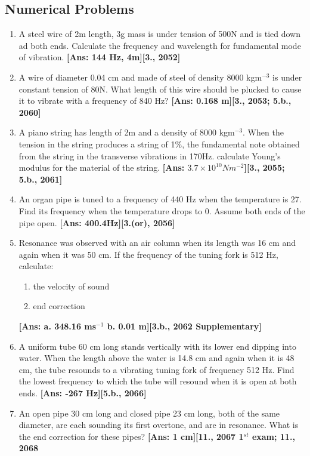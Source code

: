 \documentclass[a4paper,10pt]{report}
\begin{document}
 \subsection{Numerical Problems}
  \begin{enumerate}
   \item A steel wire of 2m length, 3g mass is under tension of 500N and is tied down ad both ends. Calculate the frequency
    and wavelength for fundamental mode of vibration. \textbf{[Ans: 144 Hz, 4m][3., 2052]}
   \item A wire of diameter 0.04 cm and made of steel of density 8000 kgm$^{-3}$ is under constant tension of 80N. What
    length of this wire should be plucked to cause it to vibrate with a frequency of 840 Hz? \textbf{[Ans: 0.168 m][3., 2053;
    5.b., 2060]}
   \item A piano string has length of 2m and a density of 8000 kgm$^{-3}$. When the tension in the string produces a string
    of 1\%{}, the fundamental note obtained from the string in the transverse vibrations in 170Hz. calculate Young's modulus
    for the material of the string. \textbf{[Ans: $3.7\times10^{10} Nm^{-2}$][3., 2055; 5.b., 2061]}
   \item An organ pipe is tuned to a frequency of 440 Hz when the temperature is 27\textcelsius{}. Find its frequency when
    the temperature drops to 0\textcelsius{}. Assume both ends of the pipe open. \textbf{[Ans: 400.4Hz][3.(or), 2056]}
   \item Resonance was observed with an air column when its length was 16 cm and again when it was 50 cm. If the frequency of
    the tuning fork is 512 Hz, calculate:
    \begin{enumerate}
     \item the velocity of sound
     \item end correction
    \end{enumerate}
    \textbf{[Ans: a. 348.16 ms$^{-1}$ b. 0.01 m][3.b., 2062 Supplementary]}
   \item A uniform tube 60 cm long stands vertically with its lower end dipping into water. When the length above the water 
    is 14.8 cm and again when it is 48 cm, the tube resounds to a vibrating tuning fork of frequency 512 Hz. Find the lowest 
    frequency to which the tube will resound when it is open at both ends. \textbf{[Ans: -267 Hz][5.b., 2066]}
   \item An open pipe 30 cm long and closed pipe 23 cm long, both of the same diameter, are each sounding its first overtone,
    and are in resonance. What is the end correction for these pipes? \textbf{[Ans: 1 cm][11., 2067 1$^{st}$ exam; 11., 2068
}
\end{enumerate}
\end{document}
